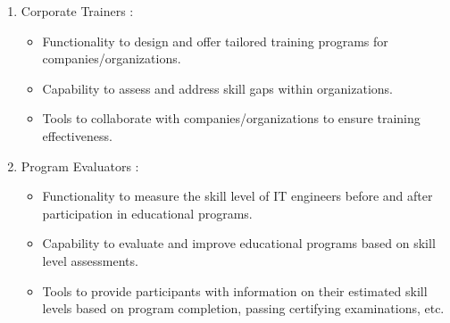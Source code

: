 \begin{enumerate}
\begin{enumerate}
                    \newpage
              \item Corporate Trainers : \\
                    \begin{itemize}
                        \renewcommand\labelitemi{-}
                        \item Functionality to design and offer tailored training programs for companies/organizations.
                        \item Capability to assess and address skill gaps within organizations.
                        \item Tools to collaborate with companies/organizations to ensure training effectiveness.
                    \end{itemize}
              \item Program Evaluators : \\
                    \begin{itemize}
                        \renewcommand\labelitemi{-}
                        \item Functionality to measure the skill level of IT engineers before and after participation in educational programs.
                        \item Capability to evaluate and improve educational programs based on skill level assessments.
                        \item Tools to provide participants with information on their estimated skill levels based on program completion, passing certifying examinations, etc.
                    \end{itemize}
          \end{enumerate}
          
\end{enumerate}


